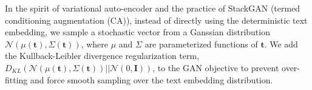 \documentclass[10pt,twocolumn,letterpaper]{article}
\begin{document}
In the spirit of variational auto-encoder \cite{vae} and the practice of StackGAN \cite{han2017stackgan} (termed conditioning augmentation (CA)), instead of directly using the deterministic text embedding, we sample a stochastic vector from a Ganssian distribution $\mathcal{N}(\mu({\bm t}), \Sigma({\bm t}))$, where $\mu$ and $\Sigma$ are parameterized functions of $\bm t$. 
We add the Kullback-Leibler divergence regularization term, $D_{KL}(\mathcal{N}(\mu({\bm t}), \Sigma({\bm t}) )|| \mathcal{N}(0, \bm{I}))$, to the GAN objective to prevent over-fitting and force smooth sampling over the text embedding distribution. 






\end{document}
